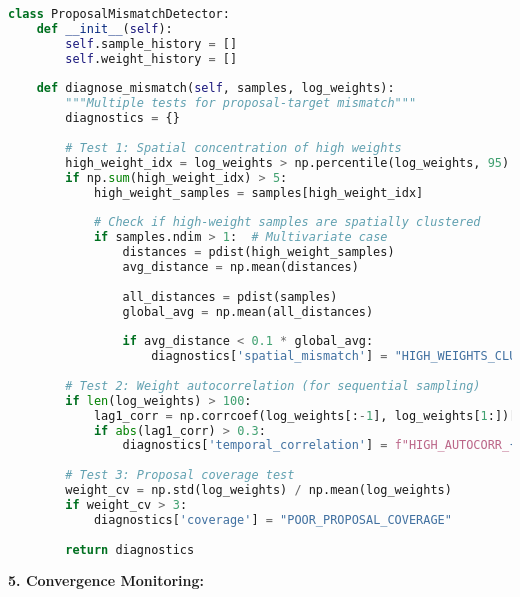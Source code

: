 \documentclass[11pt]{article}
\begin{document}
\begin{lstlisting}[language=Python, basicstyle=\small]
class ProposalMismatchDetector:
    def __init__(self):
        self.sample_history = []
        self.weight_history = []
        
    def diagnose_mismatch(self, samples, log_weights):
        """Multiple tests for proposal-target mismatch"""
        diagnostics = {}
        
        # Test 1: Spatial concentration of high weights
        high_weight_idx = log_weights > np.percentile(log_weights, 95)
        if np.sum(high_weight_idx) > 5:
            high_weight_samples = samples[high_weight_idx]
            
            # Check if high-weight samples are spatially clustered
            if samples.ndim > 1:  # Multivariate case
                distances = pdist(high_weight_samples)
                avg_distance = np.mean(distances)
                
                all_distances = pdist(samples)
                global_avg = np.mean(all_distances)
                
                if avg_distance < 0.1 * global_avg:
                    diagnostics['spatial_mismatch'] = "HIGH_WEIGHTS_CLUSTERED"
        
        # Test 2: Weight autocorrelation (for sequential sampling)
        if len(log_weights) > 100:
            lag1_corr = np.corrcoef(log_weights[:-1], log_weights[1:])[0,1]
            if abs(lag1_corr) > 0.3:
                diagnostics['temporal_correlation'] = f"HIGH_AUTOCORR_{lag1_corr:.2f}"
        
        # Test 3: Proposal coverage test
        weight_cv = np.std(log_weights) / np.mean(log_weights)
        if weight_cv > 3:
            diagnostics['coverage'] = "POOR_PROPOSAL_COVERAGE"
            
        return diagnostics
\end{lstlisting}

\textbf{5. Convergence Monitoring:}
\end{document}
